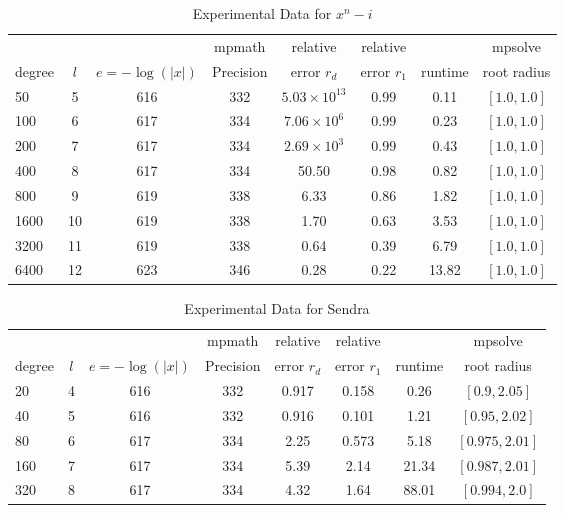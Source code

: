 \documentclass[sigconf]{acmart}
\begin{document}
\begin{table}[t]
\caption{Experimental Data for $x^n - i$}
\label{tab:nrooti}
\vskip -0.15in
\begin{center}
\begin{small}
\begin{sc}
\begin{tabular}{lccccccc}
\toprule
&  &  & mpmath & relative  & relative &  & mpsolve \\
degree  & $l$& $e=-\log(|x|)$& Precision &error $r_d$       & error $r_1$ &runtime& root radius\\
\midrule
    50 & 5 & 616 & 332 & $5.03 \times 10^{13}$ & 0.99 & 0.11 & $[1.0, 1.0]$ \\
  100 & 6 & 617 & 334 & $7.06 \times 10^{6}$ & 0.99 & 0.23 & $[1.0, 1.0]$ \\%
  200 & 7 & 617 & 334 & $2.69 \times 10^{3}$ & 0.99 & 0.43 &  $[1.0, 1.0]$ \\
  400 & 8 & 617 & 334 & 50.50 & 0.98 & 0.82 & $[1.0, 1.0]$ \\
  800 & 9 &  619 & 338 & 6.33 & 0.86 & 1.82 & $[1.0, 1.0]$ \\
1600 &10& 619 & 338 & 1.70 & 0.63 & 3.53 & $[1.0, 1.0]$ \\
3200 &11& 619 & 338 & 0.64 & 0.39 & 6.79 & $[1.0, 1.0]$ \\
6400 &12& 623 & 346 & 0.28 & 0.22 & 13.82 & $[1.0, 1.0]$ \\
\bottomrule
\end{tabular}
\end{sc}
\end{small}
\end{center}
\vskip 0.05in
\end{table}

\begin{table}[t]
\caption{Experimental Data for Sendra}
\label{tab:sendra}
\vskip -0.15in
\begin{center}
\begin{small}
\begin{sc}
\begin{tabular}{lccccccc}
\toprule
&  &  & mpmath & relative  & relative &  & mpsolve \\
degree  & $l$& $e=-\log(|x|)$& Precision &error $r_d$       & error $r_1$ &runtime& root radius\\
\midrule
 20 & 4 & 616 & 332 & 0.917 & 0.158 & 0.26 & $[0.9, 2.05]$\\
 40 & 5 & 616 & 332 & 0.916 & 0.101 & 1.21 & $[0.95, 2.02]$\\
 80 & 6 & 617 & 334 & 2.25 & 0.573 & 5.18 & $[0.975, 2.01]$\\
 160 & 7 & 617 & 334 & 5.39 & 2.14 & 21.34 & $[0.987, 2.01]$\\
 320 & 8 & 617 & 334 & 4.32 & 1.64 & 88.01 & $[0.994, 2.0]$\\
\bottomrule
\end{tabular}
\end{sc}
\end{small}
\end{center}
\vskip 0.05in
\end{table}
\end{document}
